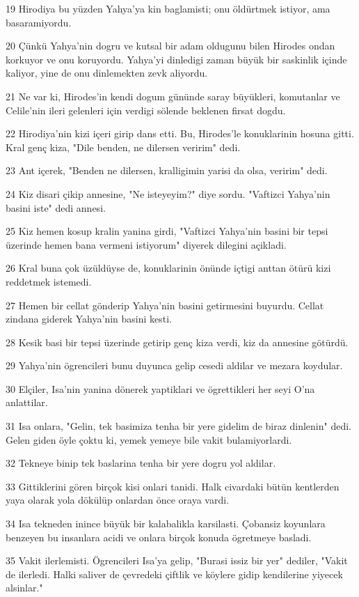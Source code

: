 \par 19 Hirodiya bu yüzden Yahya'ya kin baglamisti; onu öldürtmek istiyor, ama basaramiyordu.
\par 20 Çünkü Yahya'nin dogru ve kutsal bir adam oldugunu bilen Hirodes ondan korkuyor ve onu koruyordu. Yahya'yi dinledigi zaman büyük bir saskinlik içinde kaliyor, yine de onu dinlemekten zevk aliyordu.
\par 21 Ne var ki, Hirodes'in kendi dogum gününde saray büyükleri, komutanlar ve Celile'nin ileri gelenleri için verdigi sölende beklenen firsat dogdu.
\par 22 Hirodiya'nin kizi içeri girip dans etti. Bu, Hirodes'le konuklarinin hosuna gitti. Kral genç kiza, "Dile benden, ne dilersen veririm" dedi.
\par 23 Ant içerek, "Benden ne dilersen, kralligimin yarisi da olsa, veririm" dedi.
\par 24 Kiz disari çikip annesine, "Ne isteyeyim?" diye sordu. "Vaftizci Yahya'nin basini iste" dedi annesi.
\par 25 Kiz hemen kosup kralin yanina girdi, "Vaftizci Yahya'nin basini bir tepsi üzerinde hemen bana vermeni istiyorum" diyerek dilegini açikladi.
\par 26 Kral buna çok üzüldüyse de, konuklarinin önünde içtigi anttan ötürü kizi reddetmek istemedi.
\par 27 Hemen bir cellat gönderip Yahya'nin basini getirmesini buyurdu. Cellat zindana giderek Yahya'nin basini kesti.
\par 28 Kesik basi bir tepsi üzerinde getirip genç kiza verdi, kiz da annesine götürdü.
\par 29 Yahya'nin ögrencileri bunu duyunca gelip cesedi aldilar ve mezara koydular.
\par 30 Elçiler, Isa'nin yanina dönerek yaptiklari ve ögrettikleri her seyi O'na anlattilar.
\par 31 Isa onlara, "Gelin, tek basimiza tenha bir yere gidelim de biraz dinlenin" dedi. Gelen giden öyle çoktu ki, yemek yemeye bile vakit bulamiyorlardi.
\par 32 Tekneye binip tek baslarina tenha bir yere dogru yol aldilar.
\par 33 Gittiklerini gören birçok kisi onlari tanidi. Halk civardaki bütün kentlerden yaya olarak yola dökülüp onlardan önce oraya vardi.
\par 34 Isa tekneden inince büyük bir kalabalikla karsilasti. Çobansiz koyunlara benzeyen bu insanlara acidi ve onlara birçok konuda ögretmeye basladi.
\par 35 Vakit ilerlemisti. Ögrencileri Isa'ya gelip, "Burasi issiz bir yer" dediler, "Vakit de ilerledi. Halki saliver de çevredeki çiftlik ve köylere gidip kendilerine yiyecek alsinlar."
